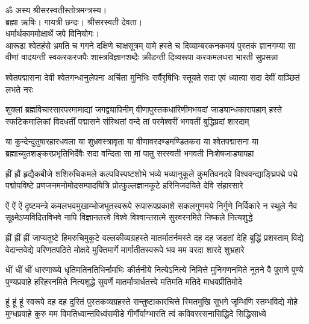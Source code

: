 
\setlength{\shlokaspaceskip}{12pt}
ॐ अस्य श्रीसरस्वतीस्तोत्रमन्त्रस्य।\\
ब्रह्मा ऋषिः। गायत्री छन्दः। श्रीसरस्वती देवता।\\
धर्मार्थकाममोक्षार्थे जपे विनियोगः।\\

\fourlineindentedshloka
{आरूढा श्वेतहंसे भ्रमति च गगने दक्षिणे चाक्षसूत्रम्}
{वामे हस्ते च दिव्याम्बरकनकमयं पुस्तकं ज्ञानगम्या}
{सा वीणां वादयन्ती स्वकरकरजपैः शास्त्रविज्ञानशब्दैः}
{क्रीडन्ती दिव्यरूपा करकमलधरा भारती सुप्रसन्ना}

\threelineshloka
{श्वेतपद्मासना देवी श्वेतगन्धानुलेपना}
{अर्चिता मुनिभिः सर्वैरृषिभिः स्तूयते सदा}
{एवं ध्यात्वा सदा देवीं वाञ्छितं लभते नरः}

\fourlineindentedshloka
{शुक्लां ब्रह्मविचारसारपरमामाद्यां जगद्व्यापिनीम्}
{वीणापुस्तकधारिणीमभयदां जाड्यान्धकारापहाम्}
{हस्ते स्फटिकमालिकां विदधतीं पद्मासने संस्थितां}
{वन्दे तां परमेश्वरीं भगवतीं बुद्धिप्रदां शारदाम्}

\fourlineindentedshloka
{या कुन्देन्दुतुषारहारधवला या शुभ्रवस्त्रावृता}
{या वीणावरदण्डमण्डितकरा या श्वेतपद्मासना}
{या ब्रह्माच्युतशङ्करप्रभृतिभिर्देवैः सदा वन्दिता}
{सा मां पातु सरस्वती भगवती निःशेषजाड्यापहा}

\fourlineindentedshloka
{ह्रीं ह्रौं हृद्यैकबीजे शशिरुचिकमले कल्पविस्पष्टशोभे}
{भव्ये भव्यानुकूले कुमतिवनदवे विश्ववन्द्याङ्घ्रिपद्मे}
{पद्मे पद्मोपविष्टे प्रणजनमनोमोदसम्पादयित्रि}
{प्रोत्फुल्लज्ञानकूटे हरिनिजदयिते देवि संहारसारे}

\fourlineindentedshloka
{ऐं ऐं ऐं दृष्टमन्त्रे कमलभवमुखाम्भोजभूतस्वरूपे}
{रूपारूपप्रकाशे सकलगुणमये निर्गुणे निर्विकारे}
{न स्थूले नैव सूक्ष्मेऽप्यविदितविभवे नापि विज्ञानतत्त्वे}
{विश्वे विश्वान्तरात्मे सुरवरनमिते निष्कले नित्यशुद्धे}

\fourlineindentedshloka
{ह्रीं ह्रीं ह्रीं जाप्यतुष्टे हिमरुचिमुकुटे वल्लकीव्यग्रहस्ते}
{मातर्मातर्नमस्ते दह दह जडतां देहि बुद्धिं प्रशस्ताम्}
{विद्ये वेदान्तवेद्ये परिणतपठिते मोक्षदे मुक्तिमार्गे}
{मार्गातीतस्वरूपे भव मम वरदा शारदे शुभ्रहारे}

\fourlineindentedshloka
{धीं धीं धीं धारणाख्ये धृतिमतिनतिभिर्नामभिः कीर्तनीये}
{नित्येऽनित्ये निमित्ते मुनिगणनमिते नूतने वै पुराणे}
{पुण्ये पुण्यप्रवाहे हरिहरनमिते नित्यशुद्धे सुवर्णे}
{मातर्मात्रार्धतत्त्वे मतिमति मतिदे माधवप्रीतिमोदे}

\fourlineindentedshloka
{हूं हूं हूं स्वरूपे दह दह दुरितं पुस्तकव्यग्रहस्ते}
{सन्तुष्टाकारचित्ते स्मितमुखि सुभगे जृम्भिणि स्तम्भविद्ये}
{मोहे मुग्धप्रवाहे कुरु मम विमतिध्वान्तविध्वंसमीडे}
{गीर्गौर्वाग्भारति त्वं कविवररसनासिद्धिदे सिद्धिसाध्ये}

